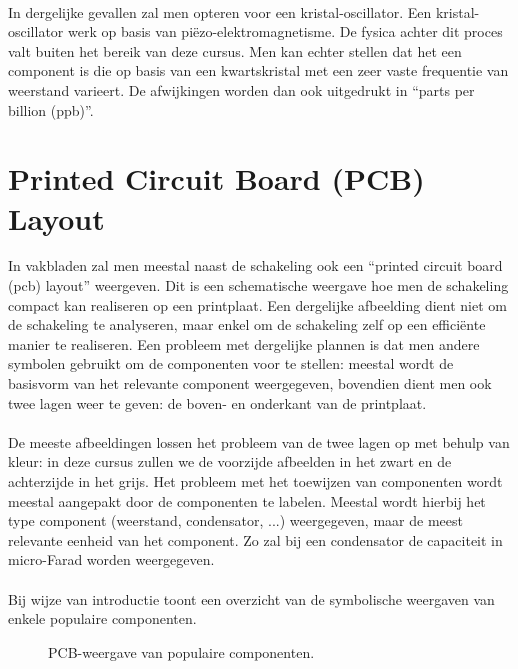 \paragraph{}
In dergelijke gevallen zal men opteren voor een kristal-oscillator. Een kristal-oscillator werk op basis van pi\"ezo-elektromagnetisme. De fysica achter dit proces valt buiten het bereik van deze cursus. Men kan echter stellen dat het een component is die op basis van een kwartskristal met een zeer vaste frequentie van weerstand varieert. De afwijkingen worden dan ook uitgedrukt in ``parts per billion (ppb)''.
\section{Printed Circuit Board (PCB) Layout}
In vakbladen zal men meestal naast de schakeling ook een ``printed circuit board (pcb) layout'' weergeven. Dit is een schematische weergave hoe men de schakeling compact kan realiseren op een printplaat. Een dergelijke afbeelding dient niet om de schakeling te analyseren, maar enkel om de schakeling zelf op een effici\"ente manier te realiseren. Een probleem met dergelijke plannen is dat men andere symbolen gebruikt om de componenten voor te stellen: meestal wordt de basisvorm van het relevante component weergegeven, bovendien dient men ook twee lagen weer te geven: de boven- en onderkant van de printplaat.
\paragraph{}
De meeste afbeeldingen lossen het probleem van de twee lagen op met behulp van kleur: in deze cursus zullen we de voorzijde afbeelden in het zwart en de achterzijde in het grijs. Het probleem met het toewijzen van componenten wordt meestal aangepakt door de componenten te labelen. Meestal wordt hierbij het type component (weerstand, condensator, ...) weergegeven, maar de meest relevante eenheid van het component. Zo zal bij een condensator de capaciteit in micro-Farad worden weergegeven.
\paragraph{}
Bij wijze van introductie toont  een overzicht van de symbolische weergaven van enkele populaire componenten.
\begin{figure}[hbt]
\centering
{}
\caption{PCB-weergave van populaire componenten.}
\end{figure}
